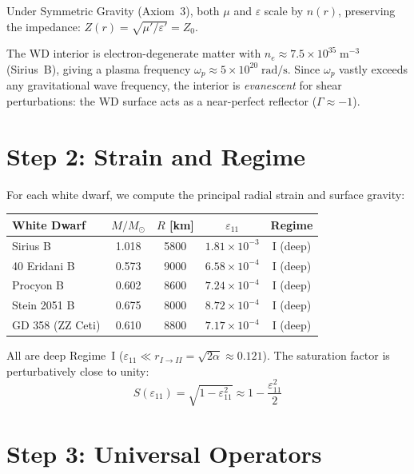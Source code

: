 Under Symmetric Gravity (Axiom~3), both $\mu$ and $\varepsilon$ scale by $n(r)$,
preserving the impedance: $Z(r) = \sqrt{\mu'/\varepsilon'} = Z_0$.

The WD interior is electron-degenerate matter with
$n_e \approx 7.5 \times 10^{35}\;\text{m}^{-3}$ (Sirius~B),
giving a plasma frequency $\omega_p \approx 5 \times 10^{20}\;\text{rad/s}$.
Since $\omega_p$ vastly exceeds any gravitational wave frequency,
the interior is \textit{evanescent} for shear perturbations:
the WD surface acts as a near-perfect reflector ($\Gamma \approx -1$).

\section{Step 2: Strain and Regime}

For each white dwarf, we compute the principal radial strain and surface gravity:

\begin{center}
\begin{tabular}{lcccc}
\toprule
\textbf{White Dwarf} & $M/M_\odot$ & $R$ [km] & $\varepsilon_{11}$ & \textbf{Regime} \\
\midrule
Sirius B          & 1.018 & 5800 & $1.81 \times 10^{-3}$ & I (deep) \\
40 Eridani B      & 0.573 & 9000 & $6.58 \times 10^{-4}$ & I (deep) \\
Procyon B         & 0.602 & 8600 & $7.24 \times 10^{-4}$ & I (deep) \\
Stein 2051 B      & 0.675 & 8000 & $8.72 \times 10^{-4}$ & I (deep) \\
GD 358 (ZZ Ceti)  & 0.610 & 8800 & $7.17 \times 10^{-4}$ & I (deep) \\
\bottomrule
\end{tabular}
\end{center}

All are deep Regime~I ($\varepsilon_{11} \ll r_{I \to II} = \sqrt{2\alpha} \approx 0.121$).
The saturation factor is perturbatively close to unity:
\begin{equation}
    S(\varepsilon_{11}) = \sqrt{1 - \varepsilon_{11}^2} \approx 1 - \frac{\varepsilon_{11}^2}{2}
\end{equation}

\section{Step 3: Universal Operators}

